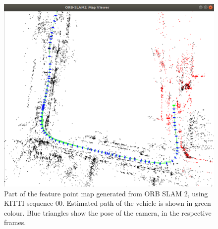 \begin{figure}[htp]
	\centering
	\includegraphics[width=\textwidth]{figs/path_pred.png}
	\vspace{-0.5cm}
	\caption[Map of feature points]{Part of the feature point map generated from ORB SLAM 2, using KITTI sequence 00. Estimated path of the vehicle is shown in green colour. Blue triangles show the pose of the camera, in the respective frames.}
	\label{fig:ra:point_map}
	\vspace{0.5cm}
\end{figure}

